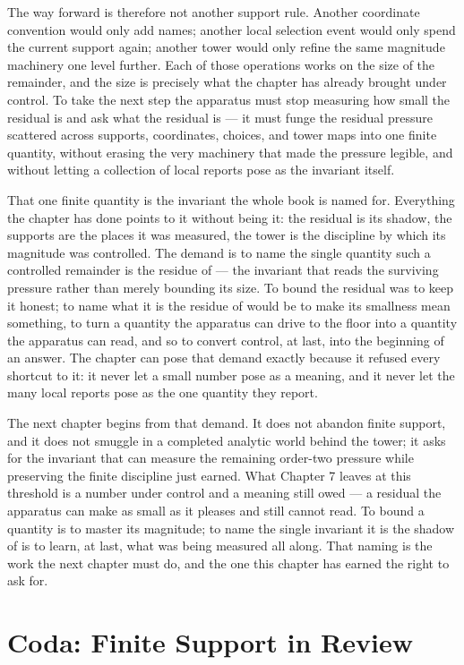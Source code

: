 The way forward is therefore not another support rule. Another coordinate convention would only add names; another local selection event would only spend the current support again; another tower would only refine the same magnitude machinery one level further. Each of those operations works on the size of the remainder, and the size is precisely what the chapter has already brought under control. To take the next step the apparatus must stop measuring how small the residual is and ask what the residual is --- it must funge the residual pressure scattered across supports, coordinates, choices, and tower maps into one finite quantity, without erasing the very machinery that made the pressure legible, and without letting a collection of local reports pose as the invariant itself.

That one finite quantity is the invariant the whole book is named for. Everything the chapter has done points to it without being it: the residual is its shadow, the supports are the places it was measured, the tower is the discipline by which its magnitude was controlled. The demand is to name the single quantity such a controlled remainder is the residue of --- the invariant that reads the surviving pressure rather than merely bounding its size. To bound the residual was to keep it honest; to name what it is the residue of would be to make its smallness mean something, to turn a quantity the apparatus can drive to the floor into a quantity the apparatus can read, and so to convert control, at last, into the beginning of an answer. The chapter can pose that demand exactly because it refused every shortcut to it: it never let a small number pose as a meaning, and it never let the many local reports pose as the one quantity they report.

The next chapter begins from that demand. It does not abandon finite support, and it does not smuggle in a completed analytic world behind the tower; it asks for the invariant that can measure the remaining order-two pressure while preserving the finite discipline just earned. What Chapter 7 leaves at this threshold is a number under control and a meaning still owed --- a residual the apparatus can make as small as it pleases and still cannot read. To bound a quantity is to master its magnitude; to name the single invariant it is the shadow of is to learn, at last, what was being measured all along. That naming is the work the next chapter must do, and the one this chapter has earned the right to ask for.

\section*{Coda: Finite Support in Review}

